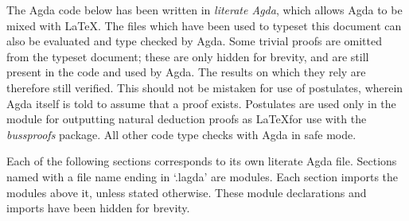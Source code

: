 
The Agda code below has been written in \emph{literate Agda}, which allows Agda
to be mixed with \LaTeX. The files which have been used to typeset this document
can also be evaluated and type checked by Agda. Some trivial proofs are omitted
from the typeset document; these are only hidden for brevity, and are still
present in the code and used by Agda. The results on which they rely are
therefore still verified. This should not be mistaken for use of postulates,
wherein Agda itself is told to assume that a proof exists. Postulates are used
only in the module for outputting natural deduction proofs as \LaTeX for use
with the \emph{bussproofs} package. All other code type checks with Agda in safe
mode.

Each of the following sections corresponds to its own literate Agda file.
Sections named with a file name ending in `.lagda' are modules. Each section
imports the modules above it, unless stated otherwise. These module declarations
and imports have been hidden for brevity.
